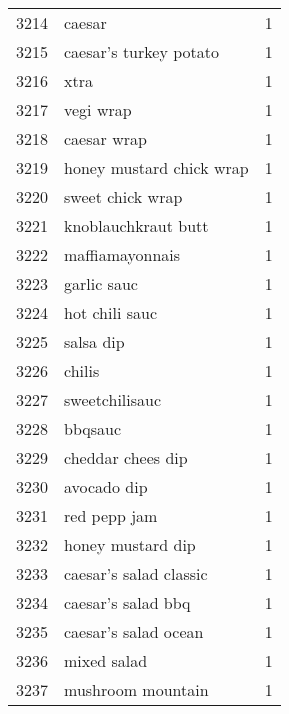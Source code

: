 \begin{tabular}{llr}
3214 &                                             caesar &      1 \\
3215 &                             caesar’s turkey potato &      1 \\
3216 &                                               xtra &      1 \\
3217 &                                          vegi wrap &      1 \\
3218 &                                        caesar wrap &      1 \\
3219 &                           honey mustard chick wrap &      1 \\
3220 &                                   sweet chick wrap &      1 \\
3221 &                                knoblauchkraut butt &      1 \\
3222 &                                    maffiamayonnais &      1 \\
3223 &                                        garlic sauc &      1 \\
3224 &                                     hot chili sauc &      1 \\
3225 &                                          salsa dip &      1 \\
3226 &                                             chilis &      1 \\
3227 &                                     sweetchilisauc &      1 \\
3228 &                                            bbqsauc &      1 \\
3229 &                                  cheddar chees dip &      1 \\
3230 &                                        avocado dip &      1 \\
3231 &                                       red pepp jam &      1 \\
3232 &                                  honey mustard dip &      1 \\
3233 &                             caesar’s salad classic &      1 \\
3234 &                                 caesar’s salad bbq &      1 \\
3235 &                               caesar’s salad ocean &      1 \\
3236 &                                        mixed salad &      1 \\
3237 &                                  mushroom mountain &      1 \\

\end{tabular}
